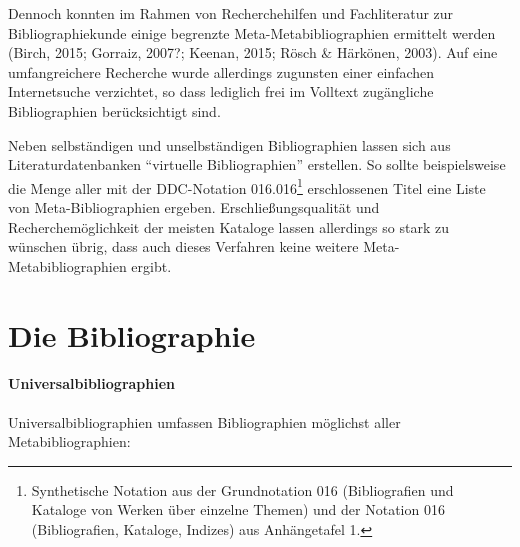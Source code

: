 \documentclass[a4paper,
fontsize=11pt,
oneside,
numbers=noperiodatend,
parskip=half-,
bibliography=totoc,
final
]{scrartcl}
\begin{document}
Dennoch konnten im Rahmen von Recherchehilfen und Fachliteratur zur
Bibliographiekunde einige begrenzte Meta-Metabibliographien ermittelt
werden (Birch, 2015; Gorraiz, 2007?; Keenan, 2015; Rösch \& Härkönen,
2003). Auf eine umfangreichere Recherche wurde allerdings zugunsten
einer einfachen Internetsuche verzichtet, so dass lediglich frei im
Volltext zugängliche Bibliographien berücksichtigt sind.

Neben selbständigen und unselbständigen Bibliographien lassen sich aus
Literaturdatenbanken \enquote{virtuelle Bibliographien} erstellen. So
sollte beispielsweise die Menge aller mit der DDC-Notation
016.016\footnote{Synthetische Notation aus der Grundnotation 016
  (Bibliografien und Kataloge von Werken über einzelne Themen) und der
  Notation 016 (Bibliografien, Kataloge, Indizes) aus Anhängetafel 1.}
erschlossenen Titel eine Liste von Meta-Bibliographien ergeben.
Erschließungsqualität und Recherchemöglichkeit der meisten Kataloge
lassen allerdings so stark zu wünschen übrig, dass auch dieses Verfahren
keine weitere Meta-Metabibliographien ergibt.

\section*{Die Bibliographie}\label{die-bibliographie}

\paragraph{Universalbibliographien}\label{universalbibliographien}

Universalbibliographien umfassen Bibliographien möglichst aller
Metabibliographien:
\end{document}
